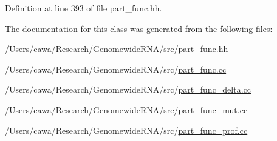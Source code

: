 Definition at line 393 of file part\+\_\+func.\+hh.



The documentation for this class was generated from the following files\+:\begin{DoxyCompactItemize}
\item 
/\+Users/cawa/\+Research/\+Genomewide\+R\+N\+A/src/\hyperlink{part__func_8hh}{part\+\_\+func.\+hh}\item 
/\+Users/cawa/\+Research/\+Genomewide\+R\+N\+A/src/\hyperlink{part__func_8cc}{part\+\_\+func.\+cc}\item 
/\+Users/cawa/\+Research/\+Genomewide\+R\+N\+A/src/\hyperlink{part__func__delta_8cc}{part\+\_\+func\+\_\+delta.\+cc}\item 
/\+Users/cawa/\+Research/\+Genomewide\+R\+N\+A/src/\hyperlink{part__func__mut_8cc}{part\+\_\+func\+\_\+mut.\+cc}\item 
/\+Users/cawa/\+Research/\+Genomewide\+R\+N\+A/src/\hyperlink{part__func__prof_8cc}{part\+\_\+func\+\_\+prof.\+cc}\end{DoxyCompactItemize}
